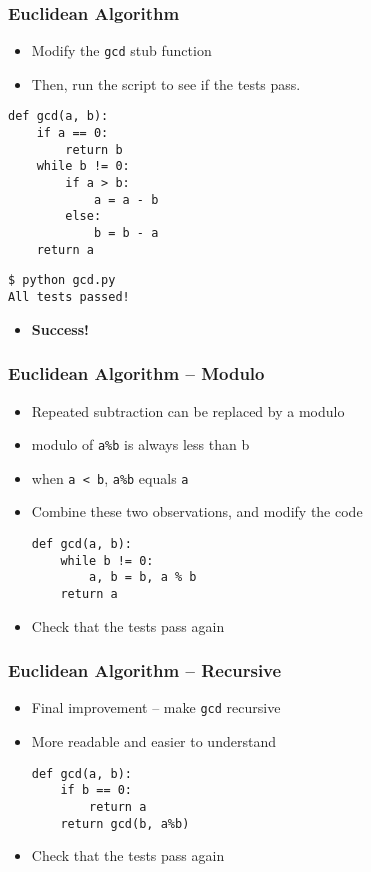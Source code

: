 \documentclass[12pt,presentation]{beamer}
\providecommand{\alert}[1]{\textbf{#1}}
\begin{document}
\begin{frame}[fragile]
  \frametitle{Euclidean Algorithm}
  \begin{itemize}
  \item Modify the \texttt{gcd} stub function
  \item Then, run the script to see if the tests pass.
  \end{itemize}
\begin{lstlisting}
def gcd(a, b):
    if a == 0:
        return b
    while b != 0:
        if a > b:
            a = a - b
        else:
            b = b - a
    return a
\end{lstlisting}
\begin{lstlisting}
$ python gcd.py
All tests passed!
\end{lstlisting} %
  \begin{itemize}
  \item \alert{Success!}
  \end{itemize}
\end{frame}


\begin{frame}[fragile]
  \frametitle{Euclidean Algorithm -- Modulo}
  \begin{itemize}
  \item Repeated subtraction can be replaced by a modulo
  \item modulo of \texttt{a\%b} is always less than b
  \item when \texttt{a < b}, \texttt{a\%b} equals \texttt{a}
  \item Combine these two observations, and modify the code
\begin{lstlisting}
def gcd(a, b):
    while b != 0:
        a, b = b, a % b
    return a
\end{lstlisting}
  \item Check that the tests pass again
  \end{itemize}
\end{frame}

\begin{frame}[fragile]
  \frametitle{Euclidean Algorithm -- Recursive}
  \begin{itemize}
  \item Final improvement -- make \texttt{gcd} recursive
  \item More readable and easier to understand
\begin{lstlisting}
def gcd(a, b):
    if b == 0:
        return a
    return gcd(b, a%b)
\end{lstlisting}
  \item Check that the tests pass again
  \end{itemize}
\end{frame}
\end{document}

